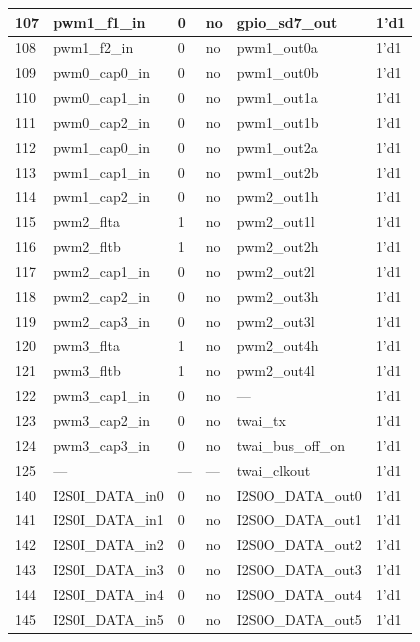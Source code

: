 \begin{longtable}[c]{|p{1cm}|p{3.8cm}|p{2.0cm}|p{2.9cm}|p{4.8cm}|p{3.0cm}| }
    107 & pwm1\_f1\_in & 0 & no & gpio\_sd7\_out & 1'd1 \\ \hline
    108 & pwm1\_f2\_in & 0 & no & pwm1\_out0a & 1'd1 \\ \hline
    109 & pwm0\_cap0\_in & 0 & no & pwm1\_out0b & 1'd1 \\ \hline
    110 & pwm0\_cap1\_in & 0 & no & pwm1\_out1a & 1'd1 \\ \hline
    111 & pwm0\_cap2\_in & 0 & no & pwm1\_out1b & 1'd1 \\ \hline
    112 & pwm1\_cap0\_in & 0 & no & pwm1\_out2a & 1'd1 \\ \hline
    113 & pwm1\_cap1\_in & 0 & no & pwm1\_out2b & 1'd1 \\ \hline
    114 & pwm1\_cap2\_in & 0 & no & pwm2\_out1h & 1'd1 \\ \hline
    115 & pwm2\_flta & 1 & no & pwm2\_out1l & 1'd1 \\ \hline
    116 & pwm2\_fltb & 1 & no & pwm2\_out2h & 1'd1 \\ \hline
    117 & pwm2\_cap1\_in & 0 & no & pwm2\_out2l & 1'd1 \\ \hline
    118 & pwm2\_cap2\_in & 0 & no & pwm2\_out3h & 1'd1 \\ \hline
    119 & pwm2\_cap3\_in & 0 & no & pwm2\_out3l & 1'd1 \\ \hline
    120 & pwm3\_flta & 1 & no & pwm2\_out4h & 1'd1 \\ \hline
    121 & pwm3\_fltb & 1 & no & pwm2\_out4l & 1'd1 \\ \hline
    122 & pwm3\_cap1\_in & 0 & no & --- & 1'd1 \\ \hline
    123 & pwm3\_cap2\_in & 0 & no & twai\_tx & 1'd1 \\ \hline
    124 & pwm3\_cap3\_in & 0 & no & twai\_bus\_off\_on & 1'd1 \\ \hline
    125 & --- & --- & --- & twai\_clkout & 1'd1 \\ \hline
    140 & I2S0I\_DATA\_in0 & 0 & no & I2S0O\_DATA\_out0 & 1'd1 \\ \hline
    141 & I2S0I\_DATA\_in1 & 0 & no & I2S0O\_DATA\_out1 & 1'd1 \\ \hline
    142 & I2S0I\_DATA\_in2 & 0 & no & I2S0O\_DATA\_out2 & 1'd1 \\ \hline
    143 & I2S0I\_DATA\_in3 & 0 & no & I2S0O\_DATA\_out3 & 1'd1 \\ \hline
    144 & I2S0I\_DATA\_in4 & 0 & no & I2S0O\_DATA\_out4 & 1'd1 \\ \hline
    145 & I2S0I\_DATA\_in5 & 0 & no & I2S0O\_DATA\_out5 & 1'd1 \\ \hline

\end{longtable}
